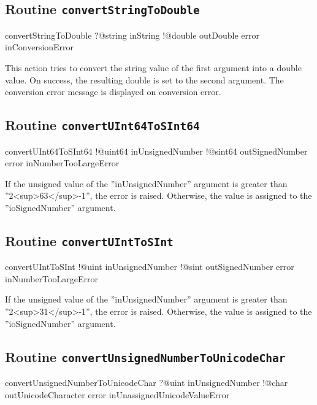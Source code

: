 \subsection{Routine \texttt{convertStringToDouble}}

\begin{galgas3}
convertStringToDouble ?@string inString
                      !@double outDouble
                      error inConversionError
\end{galgas3}

This action tries to convert the string value of the first argument into a double value. On success, the resulting double is set to the second argument. The conversion error message is displayed on conversion error.

\subsection{Routine \texttt{convertUInt64ToSInt64}}

\begin{galgas3}
convertUInt64ToSInt64 !@uint64 inUnsignedNumber
                      !@sint64 outSignedNumber
                      error inNumberTooLargeError
\end{galgas3}

If the unsigned value of the ''inUnsignedNumber'' argument is greater than ''2<sup>63</sup>-1'', the error is raised. Otherwise, the value is assigned to the ''ioSignedNumber'' argument.

\subsection{Routine \texttt{convertUIntToSInt}}

\begin{galgas3}
convertUIntToSInt !@uint inUnsignedNumber
                  !@sint outSignedNumber
                  error inNumberTooLargeError
\end{galgas3}

If the unsigned value of the ''inUnsignedNumber'' argument is greater than ''2<sup>31</sup>-1'', the error is raised. Otherwise, the value is assigned to the ''ioSignedNumber'' argument.

\subsection{Routine \texttt{convertUnsignedNumberToUnicodeChar}}

\begin{galgas3}
convertUnsignedNumberToUnicodeChar ?@uint inUnsignedNumber
                                   !@char outUnicodeCharacter
                                   error inUnassignedUnicodeValueError
\end{galgas3}

